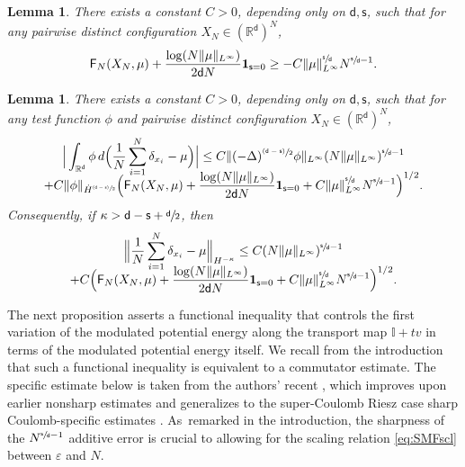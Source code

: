 \documentclass[JEP,XML,SOM,Unicode,published]{cedram}
\newcommand{\psfrac}[2]{\sfrac{(#1)}{#2}}
\theoremstyle{plain}
\newtheorem{lemma}[thm]{Lemma}
\theoremstyle{definition}
\newcommand{\I}{\mathbb{I}}
\newcommand{\R}{{\mathbb{R}}}
\let\vep\varepsilon
\let\ka\kappa
\let\ux X
\newcommand{\XN}{X_N}
\newcommand{\indic}{\mathbf{1}}
\newcommand{\Fr}{\mathsf{F}}
\renewcommand{\d}{\mathsf{d}}
\newcommand{\s}{\mathsf{s}}
\begin{document}
\begin{lemma}\label{lem:MPElb}
There exists a constant $C>0$, depending only on $\d,\s$, such that for any pairwise distinct configuration $\XN\in(\R^\d)^N$,
\begin{equation}\label{eq:MPElb}
\Fr_N(\ux_N,\mu) + \frac{\log(N\|\mu\|_{L^\infty})}{2\d N}\indic_{\s=0} \ge -C\|\mu\|_{L^\infty}^{\sfrac{\s}{\d}}N^{\sfrac{\s}{\d}-1}.
\end{equation}
\end{lemma}

\begin{lemma}\label{lem:MPEcoer}
There exists a constant $C>0$, depending only on $\d,\s$, such that for any test function $\phi$ and pairwise distinct configuration $\XN\in(\R^\d)^N$,\vspace*{-5pt}
\begin{multline*}
\Big|\int_{\R^\d}\phi \, d\Big(\frac1N\sum_{i=1}^N \delta_{x_i} - \mu\Big)\Big| \leq C\|(-\Delta)^{\psfrac{\d-\s}{2}}\phi\|_{L^\infty} (N\|\mu\|_{L^\infty})^{\sfrac{\s}{\d}-1} \\[-8pt]
+ C\|\phi\|_{\dot{H}^{\psfrac{\d-\s}{2}}}\Big(\Fr_N(\ux_N,\mu) + \frac{\log(N\|\mu\|_{L^\infty})}{2\d N}\indic_{\s=0} + C\|\mu\|_{L^\infty}^{\sfrac{\s}{\d}}N^{\sfrac{\s}{\d}-1}\Big)^{1/2}.
\end{multline*}
Consequently, if $\ka>\d-\s+\sfrac{\d}{2}$, then\vspace*{-5pt}
\begin{multline*}
\Bigl\|\frac1N\sum_{i=1}^N\delta_{x_i}-\mu\Bigr\|_{H^{-\ka}} \le C(N\|\mu\|_{L^\infty})^{\sfrac{\s}{\d}-1} \\[-8pt]
+ C \Big(\Fr_N(\ux_N,\mu) + \frac{\log(N\|\mu\|_{L^\infty})}{2\d N}\indic_{\s=0} + C\|\mu\|_{L^\infty}^{\sfrac{\s}{\d}} N^{\sfrac{\s}{\d}-1}\Big)^{1/2}.
\end{multline*}
\end{lemma}

The next proposition asserts a functional inequality that controls the first variation of the modulated potential energy along the transport map $\I+tv$ in terms of the modulated potential energy itself. We recall from the introduction that such a functional inequality is equivalent to a commutator estimate. The specific estimate below is taken from the authors' recent \cite[Th.\,1.1]{RS2022}, which improves upon earlier nonsharp estimates \cite{Duerinckx2016,Serfaty2020} and generalizes to the super-Coulomb Riesz case sharp Coulomb-specific estimates \cite{LS2018, Serfaty2023, Rosenzweig2021ne}. As~remarked in the introduction, the sharpness of the $N^{\sfrac{\s}{\d}-1}$ additive error is crucial to allowing for the scaling relation \eqref{eq:SMFscl} between $\vep$ and $N$.
\end{document}
